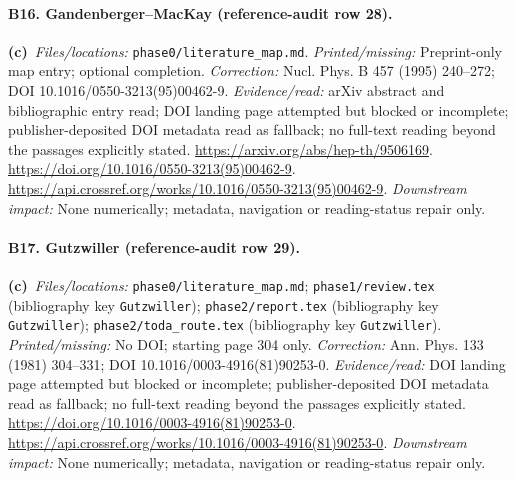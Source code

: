 \documentclass[11pt,a4paper]{article}
\newcommand{\C}{\textbf{(c)}\ }
\newcommand{\file}[1]{\nolinkurl{#1}}
\begin{document}
\paragraph{B16. Gandenberger--MacKay (reference-audit row 28).}
\C \textit{Files/locations:} \file{phase0/literature_map.md}.
\textit{Printed/missing:} Preprint-only map entry; optional completion.
\textit{Correction:} Nucl. Phys. B 457 (1995) 240--272; DOI 10.1016/0550-3213(95)00462-9.
\textit{Evidence/read:} arXiv abstract and bibliographic entry read; DOI landing page attempted but blocked or incomplete; publisher-deposited DOI metadata read as fallback; no full-text reading beyond the passages explicitly stated.
\url{https://arxiv.org/abs/hep-th/9506169}.
\url{https://doi.org/10.1016/0550-3213(95)00462-9}.
\url{https://api.crossref.org/works/10.1016/0550-3213(95)00462-9}.
\textit{Downstream impact:} None numerically; metadata, navigation or reading-status repair only.
\paragraph{B17. Gutzwiller (reference-audit row 29).}
\C \textit{Files/locations:} \file{phase0/literature_map.md}; \file{phase1/review.tex} (bibliography key \file{Gutzwiller}); \file{phase2/report.tex} (bibliography key \file{Gutzwiller}); \file{phase2/toda_route.tex} (bibliography key \file{Gutzwiller}).
\textit{Printed/missing:} No DOI; starting page 304 only.
\textit{Correction:} Ann. Phys. 133 (1981) 304--331; DOI 10.1016/0003-4916(81)90253-0.
\textit{Evidence/read:} DOI landing page attempted but blocked or incomplete; publisher-deposited DOI metadata read as fallback; no full-text reading beyond the passages explicitly stated.
\url{https://doi.org/10.1016/0003-4916(81)90253-0}.
\url{https://api.crossref.org/works/10.1016/0003-4916(81)90253-0}.
\textit{Downstream impact:} None numerically; metadata, navigation or reading-status repair only.
\end{document}
